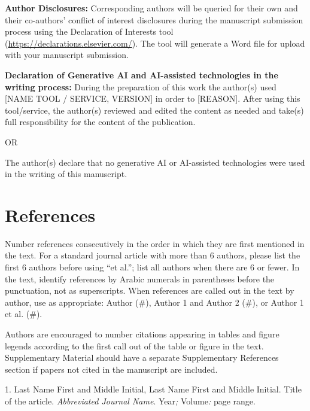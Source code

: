 \documentclass[conference]{IEEEtran}
\begin{document}
\textbf{Author Disclosures}\textbf{: }Corresponding authors will be queried for their own and their co-authors' conflict of interest disclosures during the manuscript submission process using the Declaration of Interests tool (\url{https://declarations.elsevier.com/}). The tool will generate a Word file for upload with your manuscript submission. 

\textcolor[rgb]{0.165,0.165,0.165}{\textbf{Declaration of Generative AI and AI-assisted technologies in the writing process}}\textbf{: }During the preparation of this work the author(s) used [NAME TOOL / SERVICE, VERSION] in order to [REASON]. After using this tool/service, the author(s) reviewed and edited the content as needed and take(s) full responsibility for the content of the publication.

OR

\textcolor[rgb]{0.165,0.165,0.165}{The author(s) }\textcolor[rgb]{0.165,0.165,0.165}{declare}\textcolor[rgb]{0.165,0.165,0.165}{ that no generative AI or AI-assisted technologies were used in the writing of this manuscript}\textcolor[rgb]{0.165,0.165,0.165}{.}

\section*{\textbf{References}}

\textcolor[rgb]{0.165,0.165,0.165}{Number references consecutively in the order in which they are first mentioned in the text. For a standard journal article with more than 6 authors, please list the first 6 authors before using ``et al.''; list all authors when there are 6 or fewer. In the text, identify references by Arabic numerals in parentheses before the punctuation, not as superscripts. When references are called out in the text by author, use as appropriate: Author (\#), Author 1 and Author 2 (\#), or Author 1 et al. (\#). }

\textcolor[rgb]{0.165,0.165,0.165}{Authors are encouraged to number citations appearing in tables and figure legends according to the first call out of the table or figure in the text. Supplementa}\textcolor[rgb]{0.165,0.165,0.165}{ry}\textcolor[rgb]{0.165,0.165,0.165}{ Material should have a separate Supplementa}\textcolor[rgb]{0.165,0.165,0.165}{ry}\textcolor[rgb]{0.165,0.165,0.165}{ References section if papers not cited in the manuscript are included. }

1. Last Name  First and Middle Initial, Last Name  First and Middle Initial. Title of the article. \textit{Abbreviated Journal Name}. Year\textit{;}\textit{ }Volume\textit{: }page range.
\end{document}

